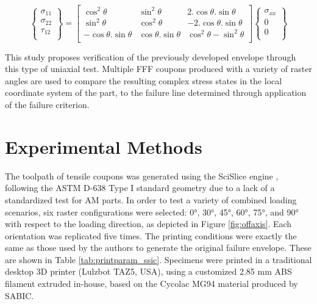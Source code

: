 \documentclass[main.tex]{subfiles}
\begin{document}
\begin{equation}
	\left\{\begin{matrix}\sigma_{11}\\\sigma_{22}\\\tau_{12}\\\end{matrix}\right\}=\left[\begin{matrix}\cos^2{\theta}&\sin^2{\theta}&2.\cos{\theta.\sin{\theta}}\\\sin^2{\theta}&\cos^2{\theta}&-2.\cos{\theta.\sin{\theta}}\\-\cos{\theta.\sin{\theta}}&\cos{\theta.\sin{\theta}}&\cos^2{\theta-\sin^2{\theta}}\\\end{matrix}\right]\left\{\begin{matrix}\sigma_{xx}\\0\\0\\\end{matrix}\right\}
\end{equation}

This study proposes verification of the previously developed envelope through this type of uniaxial test. Multiple FFF coupons produced with a variety of raster angles are used to compare the resulting complex stress states in the local coordinate system of the part, to the failure line determined through application of the failure criterion.

\section{Experimental Methods} \label{sec:exmet_ssic}

The toolpath of tensile coupons was generated using the SciSlice engine \cite{VanHulle2017a}, following the ASTM D-638 Type I standard geometry \cite{ASTMD638} due to a lack of a standardized test for AM parts. In order to test a variety of combined loading scenarios, six raster configurations were selected: 0°, 30°, 45°, 60°, 75°, and 90° with respect to the loading direction, as depicted in Figure \ref{fig:offaxis}. Each orientation was replicated five times. The printing conditions were exactly the same as those used by the authors to generate the original failure envelope. These are shown in Table \ref{tab:printparam_ssic}. Specimens were printed in a traditional desktop 3D printer (Lulzbot TAZ5, USA), using a customized 2.85 mm ABS filament extruded in-house, based on the Cycolac MG94 material produced by SABIC.
\end{document}
